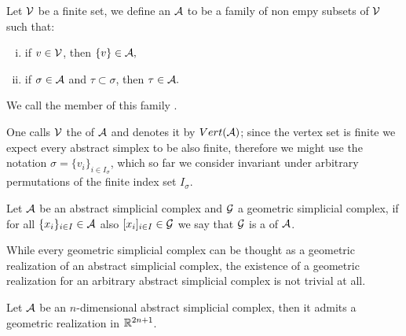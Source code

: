 \documentclass[../1.tex]{subfiles}
\begin{document}
    \begin{defn}
        Let $\mathcal{V}$ be a finite set, we define an  $\mathcal{A}$ to be 
        a family of non empy subsets of $\mathcal{V}$ such that:
        \begin{enumerate}[(i)]
            \item if $v \in \mathcal{V}$, then $\{v\} \in \mathcal{A},$
            \item if $\sigma \in \mathcal{A}$ and $\tau \subset \sigma$, then $\tau \in \mathcal{A}.$
        \end{enumerate}
        We call the member of this family .
    \end{defn}
    
    One calls $\mathcal{V}$ the  of $\mathcal{A}$ and denotes it by $Vert(\mathcal{A})$; since the vertex
    set is finite we expect every abstract simplex to be also finite, therefore we might use the notation $\sigma = \{ v_i \}_{i \in I_\sigma}$,
    which so far we consider invariant under arbitrary permutations of the finite index set $I_\sigma$.
    
    \begin{defn}
        Let $\mathcal{A}$ be an abstract simplicial complex and $\mathcal{G}$ a geometric simplicial complex, if for all $\{x_i\}_{i \in I} \in \mathcal{A}$ also $[x_i]_{i \in I} \in \mathcal{G}$
        we say that $\mathcal{G}$ is a  of $\mathcal{A}$.
    \end{defn}

    While every geometric simplicial complex can be thought as a geometric realization of an abstract simplicial complex, the existence of a geometric 
    realization for an arbitrary abstract simplicial complex is not trivial at all.

    \begin{thm}
        \label{thm:2}
        Let $\mathcal{A}$ be an $n$-dimensional abstract simplicial complex, then it admits a geometric realization in $\mathbb{R}^{2n+1}$.
    \end{thm}
\end{document}
